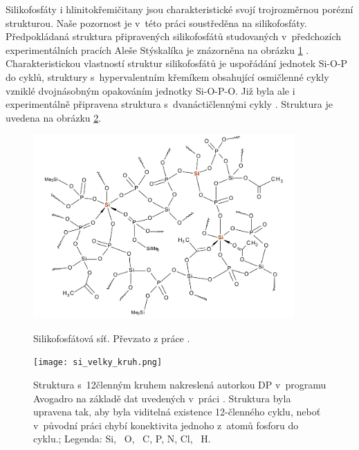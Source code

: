 \documentclass[
digital, %
table,   %
nolof,     %
nolot,     %
oneside,
]{fithesis3}
\begin{document}
Silikofosfáty i hlinitokřemičitany jsou charakteristické svojí trojrozměrnou  porézní strukturou. Naše pozornost je v~této práci soustředěna na silikofosfáty. Předpokládaná struktura připravených silikofosfátů studovaných v~předchozích experimentálních pracích Aleše Stýskalíka je znázorněna na obrázku \ref{si_polymer_cely} \cite{Styskalik2015thesis}. Charakteristickou vlastností struktur silikofosfátů je uspořádání jednotek Si-O-P do cyklů, struktury s~hypervalentním křemíkem obsahující osmičlenné cykly vzniklé dvojnásobným opakováním jednotky Si-O-P-O. Již byla ale i experimentálně připravena struktura s~dvanáctičlennými cykly \cite{velky_cyklus}. Struktura je uvedena na obrázku \ref{velky_cyklus}.
\begin{figure}
\caption{Silikofosfátová síť. Převzato z práce \cite{Styskalik2015thesis}.}\includegraphics[width=10cm]{si_polymer_cely.png}
\label{si_polymer_cely}\end{figure}

\begin{figure}
\caption{Struktura s~12členným kruhem nakreslená autorkou DP v~programu Avogadro na základě dat uvedených v~práci \cite{velky_cyklus}.  Struktura byla upravena tak, aby byla viditelná existence 12-členného cyklu, neboť v~původní práci chybí konektivita jednoho z~atomů fosforu do cyklu.;  Legenda:  Si, ~O, ~C,  P,  N,  Cl, ~H.}
\center \texttt{[image: si\_velky\_kruh.png]} \label{velky_cyklus} \end{figure}
\end{document}

